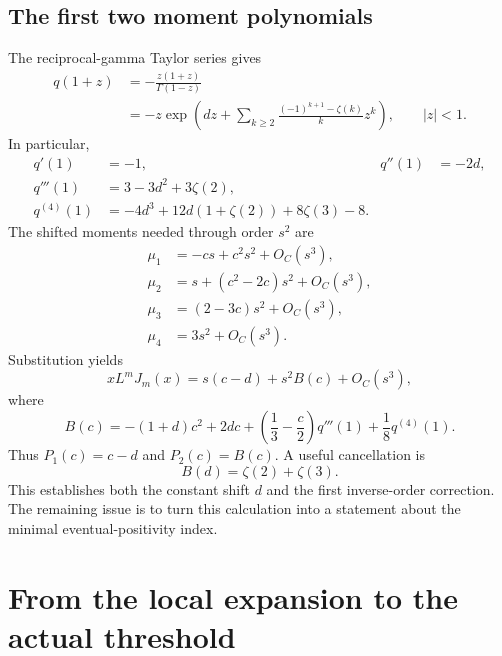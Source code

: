 \documentclass[11pt]{article}
\numberwithin{equation}{section}
\theoremstyle{definition}
\begin{document}
\subsection{The first two moment polynomials}
The reciprocal-gamma Taylor series \cite[\S5.7]{DLMF} gives
\begin{equation}\label{eq:qseries}
 \begin{split}
 q(1+z)&=-\frac{z(1+z)}{\Gamma(1-z)}\\
 &=-z\exp\left(dz+
       \sum_{k\ge2}\frac{(-1)^{k+1}-\zeta(k)}{k}z^k\right),
                  \qquad |z|<1.
 \end{split}
\end{equation}
In particular,
\begin{align}
 q'(1)&=-1,&q''(1)&=-2d,\label{eq:qderiv12}\\
 q'''(1)&=3-3d^2+3\zeta(2),\label{eq:qderiv3}\\
 q^{(4)}(1)&=-4d^3+12d(1+\zeta(2))+8\zeta(3)-8.\label{eq:qderiv4}
\end{align}
The shifted moments needed through order $s^2$ are
\begin{align}
 \mu_1&=-cs+c^2s^2+O_C(s^3),\nonumber\\
 \mu_2&=s+(c^2-2c)s^2+O_C(s^3),\nonumber\\
 \mu_3&=(2-3c)s^2+O_C(s^3),\nonumber\\
 \mu_4&=3s^2+O_C(s^3).\label{eq:fourmoments}
\end{align}
Substitution yields
\begin{equation}\label{eq:firstexpansion}
 xL^mJ_m(x)=s(c-d)+s^2B(c)+O_C(s^3),
\end{equation}
where
\begin{equation}\label{eq:B}
 B(c)=-(1+d)c^2+2dc
       +\left(\frac13-\frac c2\right)q'''(1)
       +\frac18q^{(4)}(1).
\end{equation}
Thus $P_1(c)=c-d$ and $P_2(c)=B(c)$. A useful cancellation is
\begin{equation}\label{eq:Bd}
 B(d)=\zeta(2)+\zeta(3).
\end{equation}
This establishes both the constant shift $d$ and the first inverse-order
correction. The remaining issue is to turn this calculation into a
statement about the minimal eventual-positivity index.

\section{From the local expansion to the actual threshold}\label{sec:mainproof}
\end{document}
